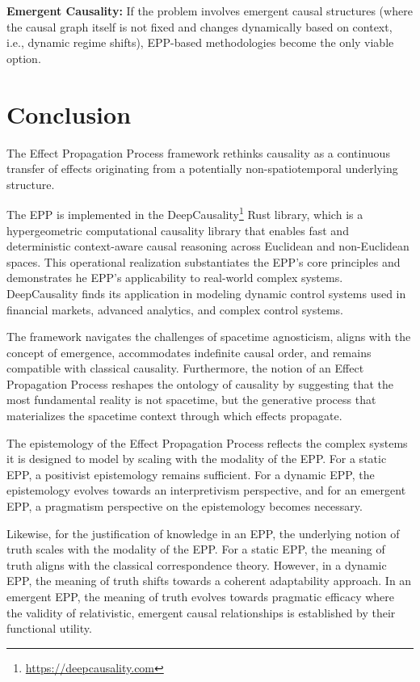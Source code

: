 \documentclass{article}
\begin{document}
\textbf{Emergent Causality:} If the problem involves emergent causal structures (where the causal graph itself is not fixed and changes dynamically based on context, i.e., dynamic regime shifts), EPP-based methodologies become the only viable option.

\newpage

\section{Conclusion}
\label{sec:conclusion}

The Effect Propagation Process framework rethinks causality as a continuous transfer of effects originating from a potentially non-spatiotemporal underlying structure. 

The EPP is implemented in the DeepCausality\footnote{\url{https://deepcausality.com}} Rust library, which is a hypergeometric computational causality library that enables fast and deterministic context-aware causal reasoning across Euclidean and non-Euclidean spaces. This operational realization substantiates the EPP’s core principles and demonstrates he EPP’s applicability to real-world complex systems.  DeepCausality finds its application in modeling dynamic control systems used in financial markets, advanced analytics, and complex control systems.

The framework navigates the challenges of spacetime agnosticism, aligns with the concept of emergence, accommodates indefinite causal order, and remains compatible with classical causality. Furthermore, the notion of an Effect Propagation Process reshapes the ontology of causality by suggesting that the most fundamental reality is not spacetime, but the generative process that materializes the spacetime context through which effects propagate.

The epistemology of the Effect Propagation Process reflects the complex systems it is designed to model by scaling with the modality of the EPP. For a static EPP, a positivist epistemology remains sufficient. For a dynamic EPP, the epistemology evolves towards an interpretivism perspective, and for an emergent EPP, a pragmatism perspective on the epistemology becomes necessary.

Likewise, for the justification of knowledge in an EPP, the underlying notion of truth scales with the modality of the EPP. For a static EPP, the meaning of truth aligns with the classical correspondence theory. However, in a dynamic EPP, the meaning of truth shifts towards a coherent adaptability approach. In an emergent EPP, the meaning of truth evolves towards pragmatic efficacy where the validity of relativistic, emergent causal relationships is established by their functional utility.
\end{document}
